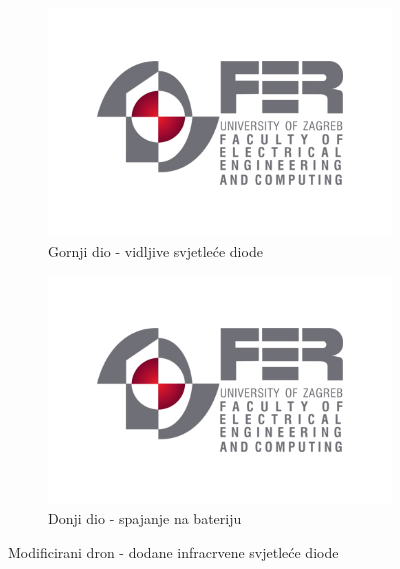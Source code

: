 \documentclass[times, utf8, diplomski]{fer}
\begin{document}
\begin{figure}[htb]
\centering
\begin{subfigure}{.45\textwidth}
  \centering
  \includegraphics[width=.4\linewidth]{img/fer_logo.jpg}
  \caption{Gornji dio - vidljive svjetleće diode}
  \label{fig:gornji}
\end{subfigure}
\begin{subfigure}{.45\textwidth}
  \centering
  \includegraphics[width=.4\linewidth]{img/fer_logo.jpg}
  \caption{Donji dio - spajanje na bateriju}
  \label{fig:donji}
\end{subfigure}
\caption{Modificirani dron - dodane infracrvene svjetleće diode}
\label{fig:modificirani dron}
\end{figure}
\end{document}
